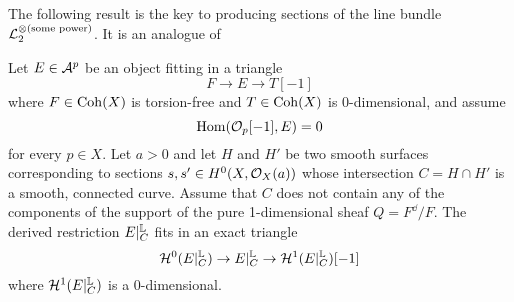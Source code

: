 The following result is the key to producing sections of the line bundle $\mathcal{L}_2^{\otimes (\text{some power})}$. It is an analogue of \cite[Lemma 6.3]{t}
\begin{prop}\label{restprop}
Let $E \in \mathcal{A}^p$ be an object fitting in a triangle
\[ F \to E \to T[-1] \]
where $F \in \operatorname{\mathrm{Coh}}(X)$ is torsion-free and $T \in \operatorname{\mathrm{Coh}}(X)$ is 0-dimensional, and assume 
\[ \mathrm{Hom}(\mathcal{O}_p[-1], E) = 0 \] 
for every $p \in X$. Let $a > 0$ and let $H$ and $H'$ be two smooth surfaces corresponding to sections $s, s' \in H^0(X, \mathcal{O}_X(a))$ whose intersection $C = H \cap H'$ is a smooth, connected curve. Assume that $C$ does not contain any of the components of the support of the pure 1-dimensional sheaf $Q = F^\dd/F$. The derived restriction $E|^{\mathbb{L}}_C$ fits in an exact triangle
\[ \mathcal{H}^0(E|^{\mathbb{L}}_C) \to E|^{\mathbb{L}}_C \to \mathcal{H}^1(E|^{\mathbb{L}}_C)[-1] \]
where $\mathcal{H}^1(E|^{\mathbb{L}}_C)$ is a 0-dimensional.
\end{prop}
